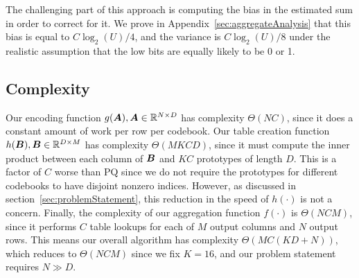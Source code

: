 The challenging part of this approach is computing the bias in the estimated sum in order to correct for it. We prove in Appendix~\ref{sec:aggregateAnalysis} that this bias is equal to $C \log_2(U) / 4$, and the variance is $C \log_2(U) / 8$ under the realistic assumption that the low bits are equally likely to be 0 or 1.

\subsection{Complexity}

Our encoding function $g(\bm{A}), \bm{A} \in \mathbb{R}^{N \times D}$ has complexity $\Theta(NC)$, since it does a constant amount of work per row per codebook. Our table creation function $h(\bm{B}), \bm{B} \in \mathbb{R}^{D \times M}$ has complexity $\Theta(MKCD)$, since it must compute the inner product between each column of $\bm{B}$ and $KC$ prototypes of length $D$. This is a factor of $C$ worse than PQ since we do not require the prototypes for different codebooks to have disjoint nonzero indices. However, as discussed in section~\ref{sec:problemStatement}, this reduction in the speed of $h(\cdot)$ is not a concern. Finally, the complexity of our aggregation function $f(\cdot)$ is $\Theta(NCM)$, since it performs $C$ table lookups for each of $M$ output columns and $N$ output rows. This means our overall algorithm has complexity $\Theta(MC(KD + N))$, which reduces to $\Theta(NCM)$ since we fix $K = 16$, and our problem statement requires $N \gg D$.
